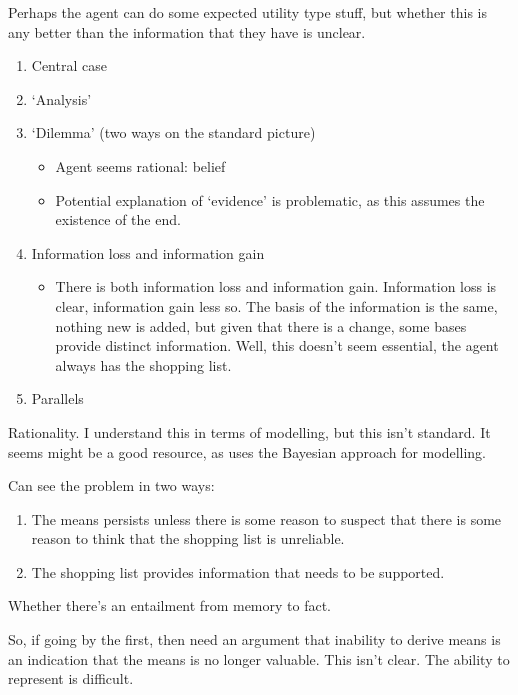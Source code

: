 \documentclass[10pt]{article}
\begin{document}
\begin{note}
  Perhaps the agent can do some expected utility type stuff, but whether this is any better than the information that they have is unclear.
\end{note}

\begin{enumerate}
\item Central case
\item `Analysis'
\item `Dilemma' (two ways on the standard picture)
  \begin{itemize}
  \item Agent seems rational: belief
  \item Potential explanation of `evidence' is problematic, as this assumes the existence of the end.
  \end{itemize}
\item Information loss and information gain
  \begin{itemize}
  \item There is both information loss and information gain.
    Information loss is clear, information gain less so.
    The basis of the information is the same, nothing new is added, but given that there is a change, some bases provide distinct information.
    Well, this doesn't seem essential, the agent always has the shopping list.
  \end{itemize}
\item Parallels
\end{enumerate}

Rationality.
I understand this in terms of modelling, but this isn't standard.
It seems \citeauthor{Titelbaum:2013aa} might be a good resource, as \citeauthor{Titelbaum:2013aa} uses the Bayesian approach for modelling.


Can see the problem in two ways:
\begin{enumerate}
\item The means persists unless there is some reason to suspect that there is some reason to think that the shopping list is unreliable.
\item The shopping list provides information that needs to be supported.
\end{enumerate}

Whether there's an entailment from memory to fact.

So, if going by the first, then need an argument that inability to derive means is an indication that the means is no longer valuable.
This isn't clear.
The ability to represent is difficult.
\end{document}
